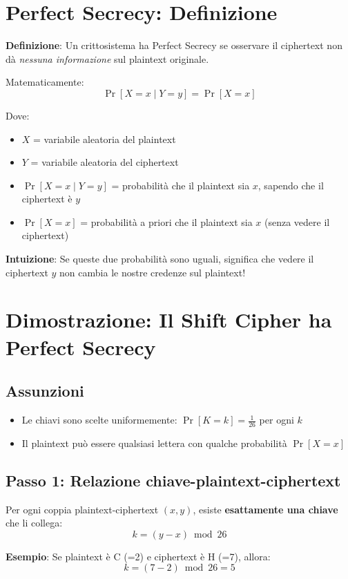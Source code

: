 \section{Perfect Secrecy: Definizione}

\textbf{Definizione}: Un crittosistema ha Perfect Secrecy se osservare il ciphertext non dà \textit{nessuna informazione} sul plaintext originale.

Matematicamente:
\[\Pr[X = x \mid Y = y] = \Pr[X = x]\]

Dove:
\begin{itemize}
    \item $X$ = variabile aleatoria del plaintext
    \item $Y$ = variabile aleatoria del ciphertext  
    \item $\Pr[X = x \mid Y = y]$ = probabilità che il plaintext sia $x$, sapendo che il ciphertext è $y$
    \item $\Pr[X = x]$ = probabilità a priori che il plaintext sia $x$ (senza vedere il ciphertext)
\end{itemize}

\textbf{Intuizione}: Se queste due probabilità sono uguali, significa che vedere il ciphertext $y$ non cambia le nostre credenze sul plaintext!

\section{Dimostrazione: Il Shift Cipher ha Perfect Secrecy}

\subsection{Assunzioni}
\begin{itemize}
    \item Le chiavi sono scelte uniformemente: $\Pr[K = k] = \frac{1}{26}$ per ogni $k$
    \item Il plaintext può essere qualsiasi lettera con qualche probabilità $\Pr[X = x]$
\end{itemize}

\subsection{Passo 1: Relazione chiave-plaintext-ciphertext}
Per ogni coppia plaintext-ciphertext $(x, y)$, esiste \textbf{esattamente una chiave} che li collega:
\[k = (y - x) \bmod 26\]

\textbf{Esempio}: Se plaintext è C (=2) e ciphertext è H (=7), allora:
\[k = (7 - 2) \bmod 26 = 5\]

